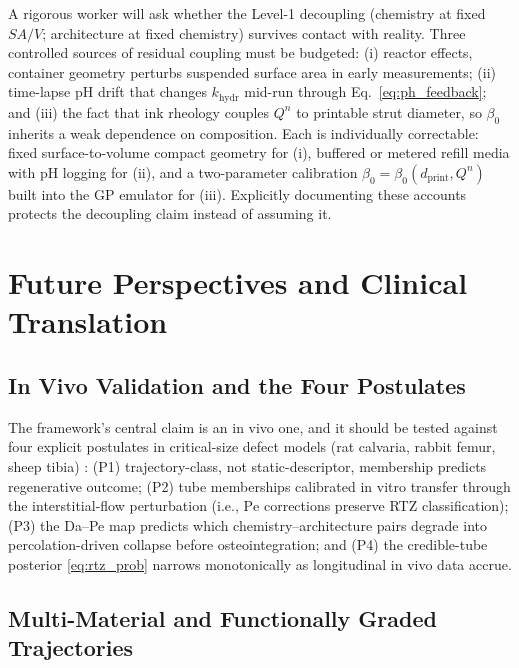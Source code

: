 \documentclass[11pt]{article}
\begin{document}
A rigorous worker will ask whether the Level-1 decoupling (chemistry at fixed $SA/V$; architecture at fixed chemistry) survives contact with reality. Three controlled sources of residual coupling must be budgeted: (i) reactor effects, container geometry perturbs suspended surface area in early measurements; (ii) time-lapse pH drift that changes $k_{\mathrm{hydr}}$ mid-run through Eq.~\eqref{eq:ph_feedback}; and (iii) the fact that ink rheology couples $Q^n$ to printable strut diameter, so $\beta_0$ inherits a weak dependence on composition. Each is individually correctable: fixed surface-to-volume compact geometry for (i), buffered or metered refill media with pH logging for (ii), and a two-parameter calibration $\beta_0=\beta_0(d_{\mathrm{print}},Q^n)$ built into the GP emulator for (iii). Explicitly documenting these accounts protects the decoupling claim instead of assuming it.


\section{Future Perspectives and Clinical Translation}
\label{sec:future}


\subsection{In Vivo Validation and the Four Postulates}


The framework's central claim is an in vivo one, and it should be tested against four explicit postulates in critical-size defect models (rat calvaria, rabbit femur, sheep tibia) \cite{Rey2014,Mastrogiacomo2016}: (P1) trajectory-class, not static-descriptor, membership predicts regenerative outcome; (P2) tube memberships calibrated in vitro transfer through the interstitial-flow perturbation (i.e., $\mathrm{Pe}$ corrections preserve RTZ classification); (P3) the Da--Pe map predicts which chemistry--architecture pairs degrade into percolation-driven collapse before osteointegration; and (P4) the credible-tube posterior \eqref{eq:rtz_prob} narrows monotonically as longitudinal in vivo data accrue.


\subsection{Multi-Material and Functionally Graded Trajectories}
\end{document}
